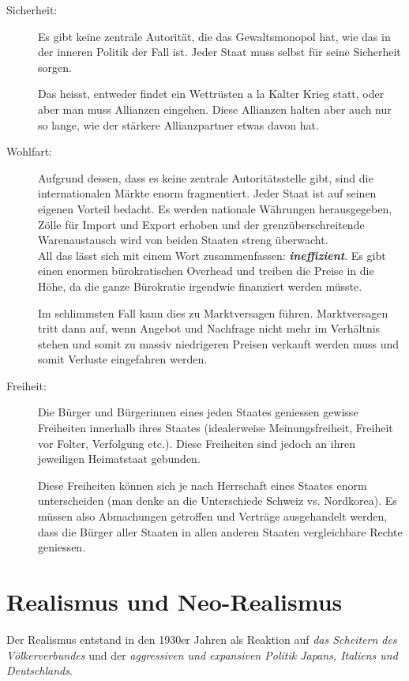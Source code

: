 \documentclass[a4paper, 11pt]{article}
\begin{document}
\begin{description}
	\item[Sicherheit: ] Es gibt keine zentrale Autorität, die das Gewaltsmonopol hat, wie das in der inneren Politik der Fall ist. Jeder Staat muss selbst für seine Sicherheit sorgen.
	
	
	Das heisst, entweder findet ein Wettrüsten a la Kalter Krieg statt, oder aber man muss Allianzen eingehen. Diese Allianzen halten aber auch nur so lange, wie der stärkere Allianzpartner etwas davon hat.
	\item[Wohlfart: ] Aufgrund dessen, dass es keine zentrale Autoritätsstelle 	gibt, sind die internationalen Märkte enorm fragmentiert. Jeder Staat ist auf seinen eigenen Vorteil bedacht. Es werden nationale Währungen herausgegeben, Zölle für Import und Export erhoben und der grenzüberschreitende Warenaustausch wird von beiden Staaten streng überwacht. \\
	All das lässt sich mit einem Wort zusammenfassen: \textit{\textbf{ineffizient}}. Es gibt einen enormen bürokratischen Overhead und treiben die Preise in die Höhe, da die ganze Bürokratie irgendwie finanziert werden müsste.
	
	
	Im schlimmsten Fall kann dies zu Marktversagen führen. Marktversagen tritt dann auf, wenn Angebot und Nachfrage nicht mehr im Verhältnis stehen und somit zu massiv niedrigeren Preisen verkauft werden muss und somit Verluste eingefahren werden.
	
	\item[Freiheit: ] Die Bürger und Bürgerinnen eines jeden Staates geniessen gewisse Freiheiten innerhalb ihres Staates (idealerweise Meinungsfreiheit, Freiheit vor Folter, Verfolgung etc.). Diese Freiheiten sind jedoch an ihren jeweiligen Heimatstaat gebunden.
	
	
	Diese Freiheiten können sich je nach Herrschaft eines Staates enorm unterscheiden (man denke an die Unterschiede Schweiz vs. Nordkorea). Es müssen also Abmachungen getroffen und Verträge ausgehandelt werden, dass die Bürger aller Staaten in allen anderen Staaten vergleichbare Rechte geniessen.
\end{description}

\newpage

\section{Realismus und Neo-Realismus}

Der Realismus entstand in den 1930er Jahren als Reaktion auf \textit{das Scheitern des Völkerverbundes} und der \textit{aggressiven und expansiven Politik Japans, Italiens und Deutschlands}.
\end{document}
